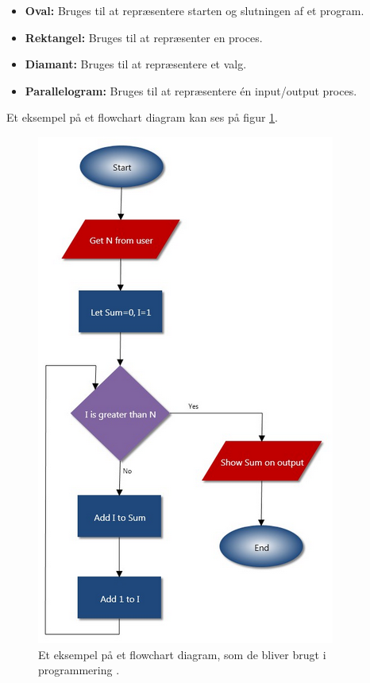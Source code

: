 \begin{itemize}
\item{\textbf{Oval:} Bruges til at repræsentere starten og slutningen af et program.}
\item{\textbf{Rektangel:} Bruges til at repræsenter en proces.}
\item{\textbf{Diamant:} Bruges til at repræsentere et valg.}
\item{\textbf{Parallelogram:} Bruges til at repræsentere én input/output proces.}
\end{itemize}
\citep{Rouse2008}

Et eksempel på et flowchart diagram kan ses på figur \ref{fig:flowchart}.

\begin{figure}[H]
\centering
\includegraphics[scale=0.75]{figures/flowchart.PNG}
\caption{Et eksempel på et flowchart diagram, som de bliver brugt i programmering \citep{Barahimi2013}.}
\label{fig:flowchart}
\end{figure}

\citep{Network2015}
